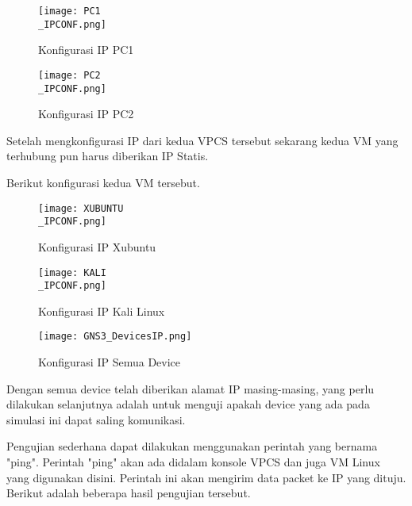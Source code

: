 \documentclass[12pt, a4paper]{article}
\begin{document}
      \begin{figure}[h]
          \centering
          \texttt{[image: PC1\\\_IPCONF.png]}
          \caption{\small{Konfigurasi IP PC1}}
      \end{figure}    

      \begin{figure}[h]
          \centering
          \texttt{[image: PC2\\\_IPCONF.png]}
          \caption{\small{Konfigurasi IP PC2}}
      \end{figure}    

      Setelah mengkonfigurasi IP dari kedua VPCS tersebut sekarang kedua VM
      yang terhubung pun harus diberikan IP Statis.

      \newpage

      Berikut konfigurasi kedua VM tersebut.

      \begin{figure}[h]
          \centering
          \texttt{[image: XUBUNTU\\\_IPCONF.png]}
          \caption{\small{Konfigurasi IP Xubuntu}}
      \end{figure}    

      \begin{figure}[h]
          \centering
          \texttt{[image: KALI\\\_IPCONF.png]}
          \caption{\small{Konfigurasi IP Kali Linux}}
      \end{figure}    

      \begin{figure}[h]
          \centering
          \texttt{[image: GNS3\_DevicesIP.png]}
          \caption{\small{Konfigurasi IP Semua Device}}
      \end{figure}    

      Dengan semua device telah diberikan alamat IP masing-masing, yang
      perlu dilakukan selanjutnya adalah untuk menguji apakah device yang
      ada pada simulasi ini dapat saling komunikasi.

      \newpage

      Pengujian sederhana dapat dilakukan menggunakan perintah yang bernama "ping".
      Perintah "ping" akan ada didalam konsole VPCS dan juga VM Linux yang digunakan disini.
      Perintah ini akan mengirim data packet ke IP yang dituju.
      Berikut adalah beberapa hasil pengujian tersebut.
\end{document}
